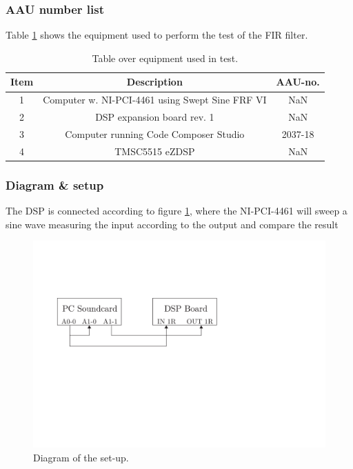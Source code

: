 

\subsubsection{AAU number list}
Table \ref{tab:UsedEquipmentListningFIRTest} shows the equipment used to perform the test of the FIR filter.
\begin{table}[H]
	\centering
	\begin{tabular}{ c c c } \toprule
	{Item}	& {Description} 								& {AAU-no}. 	\\ \bottomrule 
	1	&	Computer w. NI-PCI-4461 using Swept Sine FRF VI	& NaN			\\
	2	&	DSP expansion board rev. 1 						& NaN			\\
	3	&	Computer running Code Composer Studio			& 2037-18		\\
	4	&	TMSC5515 eZDSP 									& NaN			\\
	\bottomrule
	\end{tabular}
	\caption{Table over equipment used in test.}
	\label{tab:UsedEquipmentListningFIRTest}
\end{table}

\subsubsection{Diagram \& setup}

The DSP is connected according to figure \ref{Fig:FIRSetupDiagram}, where the NI-PCI-4461 will sweep a sine wave measuring the input according to the output and compare the result

\begin{figure}[H]
	\centering
	\includegraphics{../Journal/Experiments/Figures/FIRFilterTestSetup}
	\caption{Diagram of the set-up.}
	\label{Fig:FIRSetupDiagram}
\end{figure}

